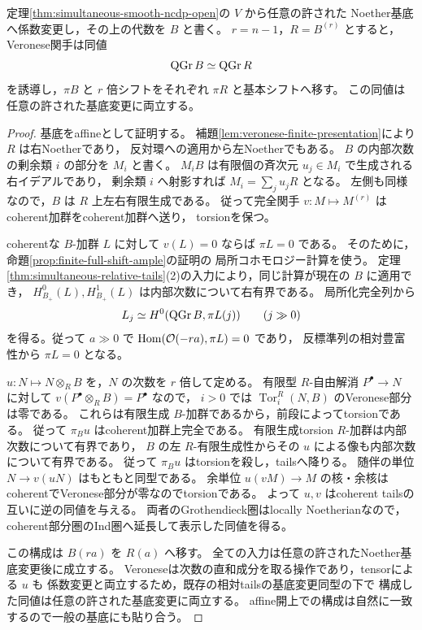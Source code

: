 \begin{lemma}[相対Veroneseによるtailsの直接復元]
\label{lem:finite-relative-veronese-tails}
定理\ref{thm:simultaneous-smooth-ncdp-open}の $V$ から任意の許された
Noether基底へ係数変更し，その上の代数を $B$ と書く。
$r=n-1$，$R=B^{(r)}$ とすると，Veronese関手は同値
\[
 \operatorname{QGr} B\simeq\operatorname{QGr} R
\]
を誘導し，$\pi B$ と $r$ 倍シフトをそれぞれ $\pi R$ と基本シフトへ移す。
この同値は任意の許された基底変更に両立する。
\end{lemma}
\begin{proof}
基底をaffineとして証明する。
補題\ref{lem:veronese-finite-presentation}により $R$ は右Noetherであり，
反対環への適用から左Noetherでもある。
$B$ の内部次数の剰余類 $i$ の部分を $M_i$ と書く。
$M_iB$ は有限個の斉次元 $u_j\in M_i$ で生成される右イデアルであり，
剰余類 $i$ へ射影すれば $M_i=\sum_j u_jR$ となる。
左側も同様なので，$B$ は $R$ 上左右有限生成である。
従って完全関手 $v:M\mapsto M^{(r)}$ はcoherent加群をcoherent加群へ送り，
torsionを保つ。

coherentな $B$-加群 $L$ に対して $v(L)=0$ ならば $\pi L=0$ である。
そのために，命題\ref{prop:finite-full-shift-ample}の証明の
局所コホモロジー計算を使う。
定理\ref{thm:simultaneous-relative-tails}(2)の入力により，同じ計算が現在の $B$ に適用でき，
$H^0_{B_+}(L),H^1_{B_+}(L)$ は内部次数について右有界である。
局所化完全列から
\[
 L_j\simeq H^0(\operatorname{QGr} B,\pi L(j))\qquad(j\gg0)
\]
を得る。従って $a\gg0$ で $\operatorname{Hom}(\mathcal O(-ra),\pi L)=0$ であり，
反標準列の相対豊富性から $\pi L=0$ となる。

$u:N\mapsto N\otimes_R B$ を，$N$ の次数を $r$ 倍して定める。
有限型 $R$-自由解消 $P^\bullet\to N$ に対して
$v(P^\bullet\otimes_R B)=P^\bullet$ なので，
$i>0$ では $\operatorname{Tor}_i^R(N,B)$ のVeronese部分は零である。
これらは有限生成 $B$-加群であるから，前段によってtorsionである。
従って $\pi_Bu$ はcoherent加群上完全である。
有限生成torsion $R$-加群は内部次数について有界であり，
$B$ の左 $R$-有限生成性からその $u$ による像も内部次数について有界である。
従って $\pi_Bu$ はtorsionを殺し，tailsへ降りる。
随伴の単位 $N\to v(uN)$ はもともと同型である。
余単位 $u(vM)\to M$ の核・余核はcoherentでVeronese部分が零なのでtorsionである。
よって $u,v$ はcoherent tailsの互いに逆の同値を与える。
両者のGrothendieck圏はlocally Noetherianなので，
coherent部分圏のInd圏へ延長して表示した同値を得る。

この構成は $B(ra)$ を $R(a)$ へ移す。
全ての入力は任意の許されたNoether基底変更後に成立する。
Veroneseは次数の直和成分を取る操作であり，tensorによる $u$ も
係数変更と両立するため，既存の相対tailsの基底変更同型の下で
構成した同値は任意の許された基底変更に両立する。
affine開上での構成は自然に一致するので一般の基底にも貼り合う。
\end{proof}


